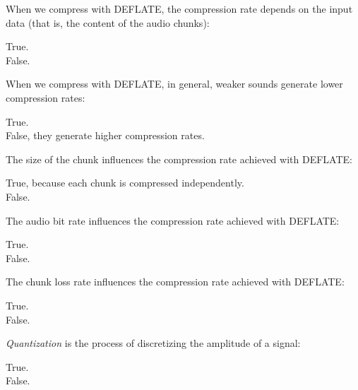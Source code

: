 \documentclass[legalpaper, 12pt, addpoints]{exam}
\begin{document}
\begin{questions}
\question When we compress with DEFLATE, the compression rate depends on the input data (that is, the content of the audio chunks):

\begin{oneparchoices}
  \choice True.\\
  \choice False.
\end{oneparchoices}
  
\vspace{0.10in}

\question When we compress with DEFLATE, in general, weaker sounds generate lower compression rates:

\begin{oneparchoices}
  \choice True.\\
  \choice False, they generate higher compression rates.
\end{oneparchoices}
  
\vspace{0.10in}

\question The size of the chunk influences the compression rate achieved with DEFLATE:

\begin{oneparchoices}
  \choice True, because each chunk is compressed independently.\\
  \choice False.
\end{oneparchoices}
  
\vspace{0.10in}

\question The audio bit rate influences the compression rate achieved with DEFLATE:

\begin{oneparchoices}
  \choice True.\\
  \choice False.
\end{oneparchoices}
  
\vspace{0.10in}

\question The chunk loss rate influences the compression rate achieved with DEFLATE:

\begin{oneparchoices}
  \choice True.\\
  \choice False.
\end{oneparchoices}
  
\vspace{0.10in}

\question \emph{Quantization} is the process of discretizing the amplitude of a signal:

\begin{oneparchoices}
  \choice True.\\
  \choice False.
\end{oneparchoices}
  

\end{questions}
\end{document}
